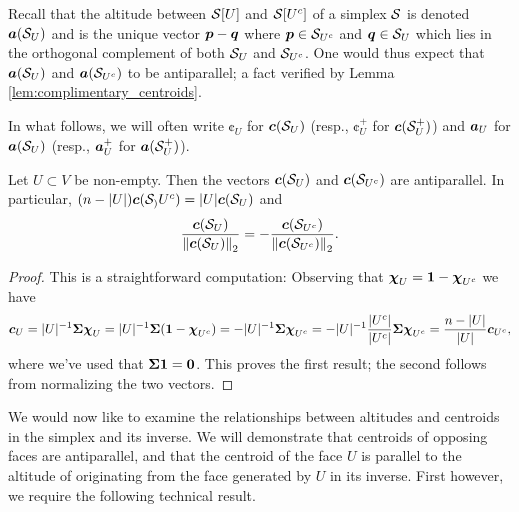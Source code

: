 Recall that the altitude between $\mathcal{S}[U]$ and $\mathcal{S}[U^c]$ of a simplex $\mathcal{S}$ is denoted $\vb*{a}(\mathcal{S}_U)$ and is the unique vector $\vb*{p}-\vb*{q}$ where  $\vb*{p}\in \mathcal{S}_{U^c}$ and $\vb*{q}\in\mathcal{S}_{U}$ which lies in the orthogonal complement of both $\mathcal{S}_U$ and $\mathcal{S}_{U^c}$. One would thus expect that $\vb*{a}(\mathcal{S}_U)$ and $\vb*{a}(\mathcal{S}_{U^c})$ to be antiparallel; a fact verified by Lemma \ref{lem:complimentary_centroids}.  

In what follows,  we will often write $\cent_U$ for $\vb*{c}(\mathcal{S}_U)$ (resp., $\cent_U^+$ for $\vb*{c}(\mathcal{S}_U^+)$) and $\vb*{a}_U$ for $\vb*{a}(\mathcal{S}_U)$ (resp., $\vb*{a}_U^+$ for $\vb*{a}(\mathcal{S}_U^+)$). 

\begin{lemma}
\label{lem:complimentary_centroids}
Let $U\subset V$ be non-empty. Then the vectors $\vb*{c}(\mathcal{S}_U)$ and $\vb*{c}(\mathcal{S}_{U^c})$ are antiparallel. In particular, $(n-|U|)\vb*{c}(\mathcal{S}_){U^c}) = |U|\vb*{c}(\mathcal{S}_{U})$ and 
\[\frac{\vb*{c}(\mathcal{S}_U)}{\norm{\vb*{c}(\mathcal{S}_U)}_2}=-\frac{\vb*{c}(\mathcal{S}_{U^c})}{\norm{\vb*{c}(\mathcal{S}_{U^c})}_2}.\]
\end{lemma}
\begin{proof}
This is a straightforward computation: Observing that $\boldsymbol{\chi}_U=\vb{1}-\boldsymbol{\chi}_{U^c}$ we have  
\[\vb*{c}_U = |U|^{-1}\boldsymbol{\Sigma}\boldsymbol{\chi}_U = |U|^{-1}\boldsymbol{\Sigma}(\vb{1}-\boldsymbol{\chi}_{U^c})=-|U|^{-1}\boldsymbol{\Sigma}\boldsymbol{\chi}_{U^c}=-|U|^{-1}\frac{|U^c|}{|U^c|}\boldsymbol{\Sigma}\boldsymbol{\chi}_{U^c}=\frac{n-|U|}{|U|}\vb*{c}_{U^c},\]
where we've used that $\boldsymbol{\Sigma}\vb{1}=\vb{0}$. This proves the first result; the second follows from normalizing the two vectors.
\end{proof}

We would now like to examine the relationships between altitudes and centroids in the simplex and its inverse. We will demonstrate that centroids of opposing faces are antiparallel, and that the centroid of the face $U$ is parallel to the altitude of originating from the face generated by $U$ in its inverse. First however, we require the following technical result. 

